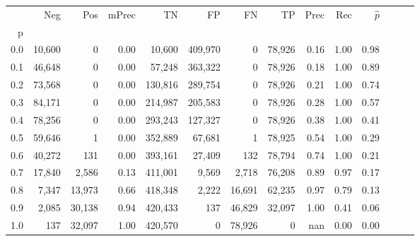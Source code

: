 \begin{tabular}{rrrrrrrrrrrrrr}
\toprule
{} &     Neg &     Pos & mPrec &       TN &       FP &      FN &      TP &  Prec &   Rec & $\hat{p}$ \\
p   &         &         &       &          &          &         &         &       &       &           \\
\midrule
0.0 &  10,600 &       0 &  0.00 &   10,600 &  409,970 &       0 &  78,926 &  0.16 &  1.00 &      0.98 \\
0.1 &  46,648 &       0 &  0.00 &   57,248 &  363,322 &       0 &  78,926 &  0.18 &  1.00 &      0.89 \\
0.2 &  73,568 &       0 &  0.00 &  130,816 &  289,754 &       0 &  78,926 &  0.21 &  1.00 &      0.74 \\
0.3 &  84,171 &       0 &  0.00 &  214,987 &  205,583 &       0 &  78,926 &  0.28 &  1.00 &      0.57 \\
0.4 &  78,256 &       0 &  0.00 &  293,243 &  127,327 &       0 &  78,926 &  0.38 &  1.00 &      0.41 \\
0.5 &  59,646 &       1 &  0.00 &  352,889 &   67,681 &       1 &  78,925 &  0.54 &  1.00 &      0.29 \\
0.6 &  40,272 &     131 &  0.00 &  393,161 &   27,409 &     132 &  78,794 &  0.74 &  1.00 &      0.21 \\
0.7 &  17,840 &   2,586 &  0.13 &  411,001 &    9,569 &   2,718 &  76,208 &  0.89 &  0.97 &      0.17 \\
0.8 &   7,347 &  13,973 &  0.66 &  418,348 &    2,222 &  16,691 &  62,235 &  0.97 &  0.79 &      0.13 \\
0.9 &   2,085 &  30,138 &  0.94 &  420,433 &      137 &  46,829 &  32,097 &  1.00 &  0.41 &      0.06 \\
1.0 &     137 &  32,097 &  1.00 &  420,570 &        0 &  78,926 &       0 &   nan &  0.00 &      0.00 \\
\bottomrule
\end{tabular}

